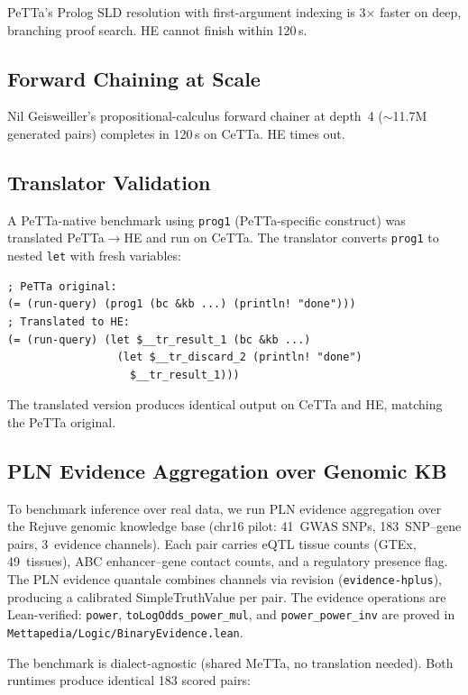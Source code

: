 \documentclass[11pt]{article}
\newcommand{\code}[1]{\texttt{#1}}
\newcommand{\PeTTa}{\textup{PeTTa}}
\newcommand{\HE}{\textup{HE}}
\newcommand{\CeTTa}{\textup{CeTTa}}
\begin{document}
\PeTTa{}'s Prolog SLD resolution with first-argument indexing is
3$\times$ faster on deep, branching proof search.  \HE{} cannot finish
within 120\,s.

\subsection{Forward Chaining at Scale}

Nil Geisweiller's propositional-calculus forward chainer at depth~4
($\sim$11.7M generated pairs) completes in 120\,s on \CeTTa{}.  \HE{}
times out.

\subsection{Translator Validation}

A PeTTa-native benchmark using \code{prog1} (PeTTa-specific construct)
was translated PeTTa$\to$HE and run on \CeTTa{}.  The translator
converts \code{prog1} to nested \code{let} with fresh variables:
\begin{lstlisting}[language={},basicstyle=\ttfamily\scriptsize]
; PeTTa original:
(= (run-query) (prog1 (bc &kb ...) (println! "done")))
; Translated to HE:
(= (run-query) (let $__tr_result_1 (bc &kb ...)
                 (let $__tr_discard_2 (println! "done")
                   $__tr_result_1)))
\end{lstlisting}
The translated version produces identical output on \CeTTa{} and \HE{},
matching the \PeTTa{} original.

\subsection{PLN Evidence Aggregation over Genomic KB}

To benchmark inference over real data, we run PLN evidence aggregation
over the Rejuve genomic knowledge base (chr16 pilot: 41~GWAS SNPs,
183~SNP--gene pairs, 3~evidence channels).  Each pair carries
eQTL tissue counts (GTEx, 49~tissues), ABC enhancer--gene contact
counts, and a regulatory presence flag.  The PLN evidence quantale
combines channels via revision (\code{evidence-hplus}), producing a
calibrated SimpleTruthValue per pair.  The evidence operations are
Lean-verified: \code{power}, \code{toLogOdds\_power\_mul}, and
\code{power\_power\_inv} are proved in
\code{Mettapedia/Logic/BinaryEvidence.lean}.

The benchmark is dialect-agnostic (shared MeTTa, no translation
needed).  Both runtimes produce identical 183 scored pairs:
\end{document}
